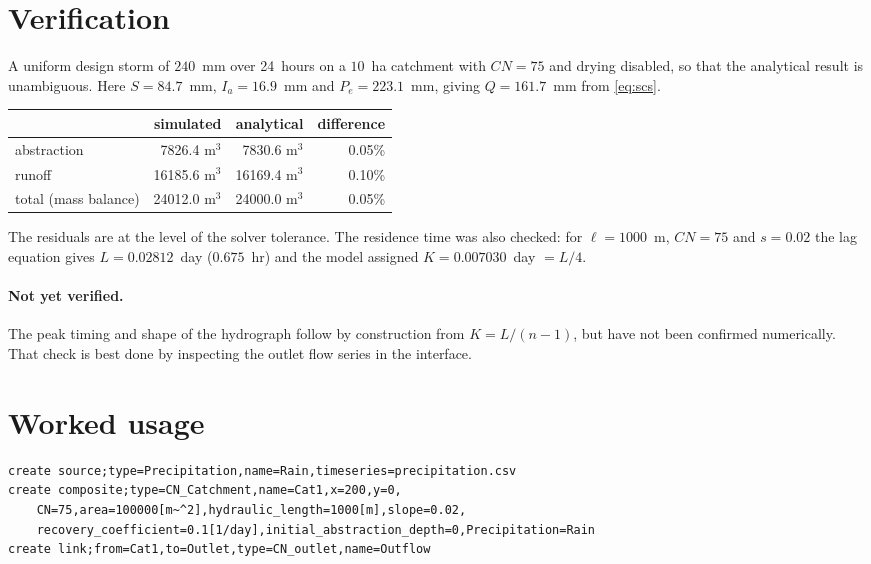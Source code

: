 \documentclass[11pt,a4paper]{article}
\begin{document}
\section{Verification}

A uniform design storm of $240$~mm over 24~hours on a $10$~ha catchment with
$CN=75$ and drying disabled, so that the analytical result is unambiguous. Here
$S=84.7$~mm, $I_a=16.9$~mm and $P_e=223.1$~mm, giving $Q=161.7$~mm from
\eqref{eq:scs}.

\begin{center}
\begin{tabular}{@{}lrrr@{}}
\toprule
& \textbf{simulated} & \textbf{analytical} & \textbf{difference}\\
\midrule
abstraction & 7826.4 m$^3$ & 7830.6 m$^3$ & 0.05\%\\
runoff & 16185.6 m$^3$ & 16169.4 m$^3$ & 0.10\%\\
total (mass balance) & 24012.0 m$^3$ & 24000.0 m$^3$ & 0.05\%\\
\bottomrule
\end{tabular}
\end{center}

\noindent
The residuals are at the level of the solver tolerance. The residence time was
also checked: for $\ell=1000$~m, $CN=75$ and $s=0.02$ the lag equation gives
$L=0.02812$~day ($0.675$~hr) and the model assigned $K=0.007030$~day $=L/4$.

\paragraph{Not yet verified.} The peak timing and shape of the hydrograph
follow by construction from $K=L/(n-1)$, but have not been confirmed
numerically. That check is best done by inspecting the outlet flow series in
the interface.

\section{Worked usage}

\begin{lstlisting}[style=plain]
create source;type=Precipitation,name=Rain,timeseries=precipitation.csv
create composite;type=CN_Catchment,name=Cat1,x=200,y=0,
    CN=75,area=100000[m~^2],hydraulic_length=1000[m],slope=0.02,
    recovery_coefficient=0.1[1/day],initial_abstraction_depth=0,Precipitation=Rain
create link;from=Cat1,to=Outlet,type=CN_outlet,name=Outflow
\end{lstlisting}
\end{document}
